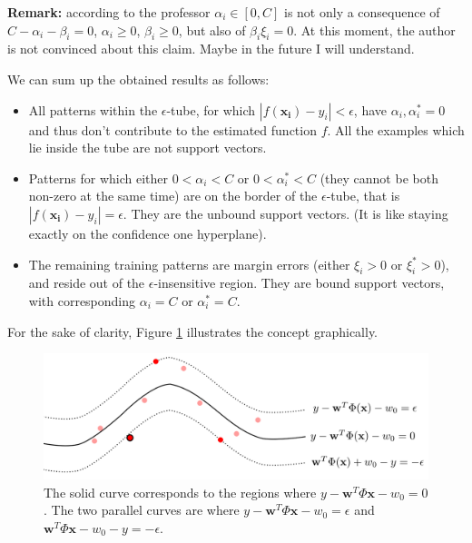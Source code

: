 \textbf{Remark:} according to the professor $\alpha_i \in [0,C]$ is not only a consequence of $C - \alpha_i - \beta_i = 0$, $\alpha_i \geq 0$, $\beta_i \geq 0$, but also of $\beta_i \xi_i = 0$. At this moment, the author is not convinced about this claim. Maybe in the future I will understand. \newline

We can sum up the obtained results as follows:
\begin{itemize}
    \item All patterns within the $\epsilon$-tube, for which $|f(\pmb{x_i})-y_i| < \epsilon$, have $\alpha_i, \alpha_i^* = 0$ and thus don't contribute to the estimated function $f$. All the examples which lie inside the tube are not support vectors.
    
    \item Patterns for which either $0 < \alpha_i < C$ or $0 < \alpha_i^* < C$ (they cannot be both non-zero at the same time) are on the border of the $\epsilon$-tube, that is $|f(\pmb{x_i})-y_i| = \epsilon$. They are the unbound support vectors. (It is like staying exactly on the confidence one hyperplane).
    
    \item The remaining training patterns are margin errors (either $\xi_i > 0$ or $\xi_i^* > 0$), and reside out of the $\epsilon$-insensitive region. They are bound support vectors, with corresponding $\alpha_i = C$ or $\alpha_i^* = C$.
\end{itemize}

For the sake of clarity, Figure \ref{fig:svm_regression_graphically} illustrates the concept graphically.

\begin{figure}[ht]
    \centering
    \includegraphics[width=\textwidth]{images/svm_regression_graphically.png}
    \caption{The solid curve corresponds to the regions where $y - \pmb{w}^T \Phi{\pmb{x}} - w_0 = 0$. The two parallel curves are where $y - \pmb{w}^T \Phi{\pmb{x}} - w_0 = \epsilon$ and $\pmb{w}^T \Phi{\pmb{x}} - w_0 - y = - \epsilon$.}
    \label{fig:svm_regression_graphically}
\end{figure}


